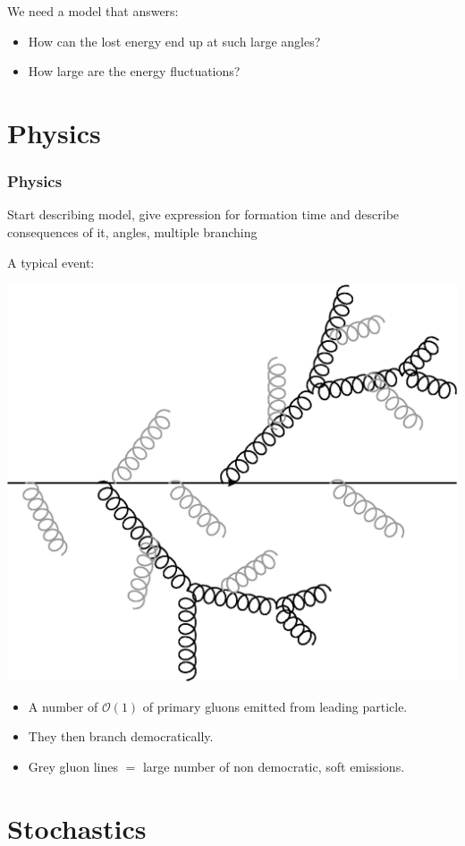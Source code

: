 \documentclass[pstricks,mathserif]{beamer}
\begin{document}
\begin{frame}
We need a model that answers:
\begin{itemize}
\item How can the lost energy end up at such large angles?
\item How large are the energy fluctuations?
\end{itemize}
\end{frame}

\section{Physics}

\begin{frame}
\frametitle{Physics}
Start describing model, give expression for formation time and describe consequences of it, angles, multiple branching
\end{frame}

\begin{frame}
A typical event:

\begin{center}
\includegraphics[width=0.5\linewidth]{democraticbranch.eps}
\end{center}

%
\begin{itemize}
\small
\item A number of $\mathcal{O}(1)$ of primary gluons emitted from leading particle.
\item They then branch democratically.
\item Grey gluon lines $=$ large number of non democratic, soft emissions.
\end{itemize}
%
%
\end{frame}


\section{Stochastics}
\end{document}
